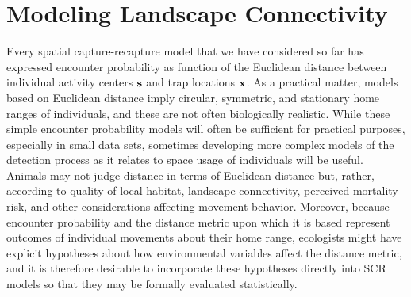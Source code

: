 \chapter{
Modeling Landscape Connectivity
}
\label{chapt.ecoldist}


\vspace{.3in}


Every spatial capture-recapture model that we have considered so far
has expressed encounter probability as function of the Euclidean
distance between individual activity centers ${\bf s}$ and trap
locations ${\bf x}$.  As a practical matter, models based on Euclidean
distance imply circular, symmetric, and stationary home ranges of
individuals, and these are not often biologically realistic.  While
these simple encounter probability models will often be sufficient for
practical purposes, especially in small data sets, sometimes
developing more complex models of the detection process as it relates
to space usage of individuals will be useful.  Animals may not judge
distance in terms of Euclidean distance but, rather, according to
quality of local habitat, landscape connectivity, perceived mortality
risk, and other considerations affecting movement behavior.  Moreover,
because encounter probability and the distance metric upon which it is
based represent outcomes of individual movements about their home
range, ecologists might have explicit hypotheses about how
environmental variables affect the distance metric, and it is
therefore desirable to incorporate these hypotheses directly into SCR
models so that they may be formally evaluated statistically.

